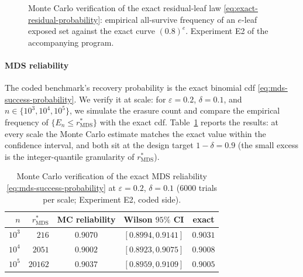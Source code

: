 \documentclass[journal]{IEEEtran}
\numberwithin{equation}{section}
\begin{document}
\begin{figure}[t]
\centering
{}
\caption{Monte Carlo verification of the exact residual-leaf law
\eqref{eq:exact-residual-probability}: empirical all-survive frequency of
an \(e\)-leaf exposed set against the exact curve \((0.8)^{e}\).
Experiment E2 of the accompanying program.}
\label{fig:residual-law-mc}
\end{figure}

\paragraph*{MDS reliability}
The coded benchmark's recovery probability is the exact binomial cdf
\eqref{eq:mds-success-probability}.  We verify it at scale: for
\(\varepsilon=0.2\), \(\delta=0.1\), and \(n\in\{10^{3},10^{4},10^{5}\}\), we
simulate the erasure count and compare the empirical frequency of
\(\{E_{n}\le r_{\mathrm{MDS}}^{*}\}\) with the exact cdf.
Table~\ref{tab:mc-reliability} reports the results: at every scale the Monte
Carlo estimate matches the exact value within the confidence interval, and
both sit at the design target \(1-\delta=0.9\) (the small excess is the
integer-quantile granularity of \(r_{\mathrm{MDS}}^{*}\)).

\begin{table}[t]
\caption{Monte Carlo verification of the exact MDS reliability
\eqref{eq:mds-success-probability} at \(\varepsilon=0.2\), \(\delta=0.1\)
(\(6000\) trials per scale; Experiment E2, coded side).}
\label{tab:mc-reliability}
\centering
\begin{tabular}{@{}rrccc@{}}
\toprule
\(n\) & \(r_{\mathrm{MDS}}^{*}\) & MC reliability & Wilson \(95\%\) CI & exact \\
\midrule
\(10^{3}\) & \(216\)   & \(0.9070\) & \([0.8994,0.9141]\) & \(0.9031\) \\
\(10^{4}\) & \(2051\)  & \(0.9002\) & \([0.8923,0.9075]\) & \(0.9008\) \\
\(10^{5}\) & \(20162\) & \(0.9037\) & \([0.8959,0.9109]\) & \(0.9005\) \\
\bottomrule
\end{tabular}
\end{table}
\end{document}
